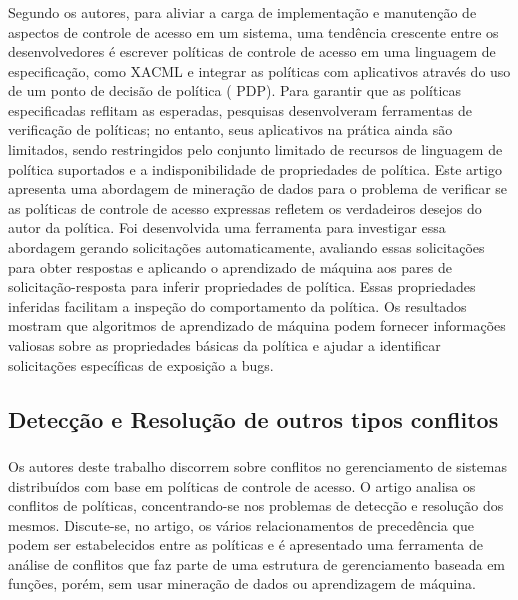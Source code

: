 \subsubsection{}
Segundo os autores, para aliviar a carga de implementação e manutenção de aspectos de controle de acesso em um sistema, uma tendência crescente entre os desenvolvedores é escrever políticas de controle de acesso em uma linguagem de especificação, como XACML e integrar as políticas com aplicativos através do uso de um ponto de decisão de política ( PDP). Para garantir que as políticas especificadas reflitam as esperadas, pesquisas desenvolveram ferramentas de verificação de políticas; no entanto, seus aplicativos na prática ainda são limitados, sendo restringidos pelo conjunto limitado de recursos de linguagem de política suportados e a indisponibilidade de propriedades de política. Este artigo apresenta uma abordagem de mineração de dados para o problema de verificar se as políticas de controle de acesso expressas refletem os verdadeiros desejos do autor da política. Foi desenvolvida uma ferramenta para investigar essa abordagem gerando solicitações automaticamente, avaliando essas solicitações para obter respostas e aplicando o aprendizado de máquina aos pares de solicitação-resposta para inferir propriedades de política. Essas propriedades inferidas facilitam a inspeção do comportamento da política. Os resultados mostram que algoritmos de aprendizado de máquina podem fornecer informações valiosas sobre as propriedades básicas da política e ajudar a identificar solicitações específicas de exposição a bugs.

\subsection{Detecção e Resolução de outros tipos conflitos}\label{trab:rel-conflitos}
\subsubsection{}
Os autores deste trabalho discorrem sobre conflitos no gerenciamento de sistemas distribuídos com base em políticas de controle de acesso. O artigo analisa os conflitos de políticas, concentrando-se nos problemas de detecção e resolução dos mesmos. Discute-se, no artigo, os vários relacionamentos de precedência que podem ser estabelecidos entre as políticas e é apresentado uma ferramenta de análise de conflitos que faz parte de uma estrutura de gerenciamento baseada em funções, porém, sem usar mineração de dados ou aprendizagem de máquina.

